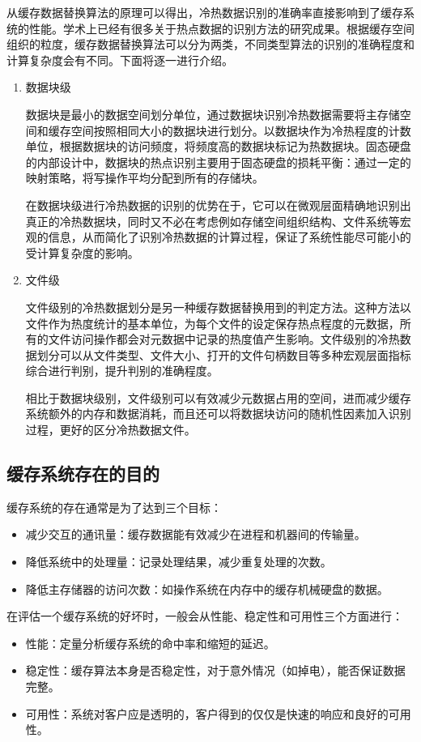 从缓存数据替换算法的原理可以得出，冷热数据识别的准确率直接影响到了缓存系统的性能。学术上已经有很多关于热点数据的识别方法的研究成果。根据缓存空间组织的粒度，缓存数据替换算法可以分为两类，不同类型算法的识别的准确程度和计算复杂度会有不同。下面将逐一进行介绍。

\begin{enumerate}
\item 数据块级

数据块是最小的数据空间划分单位，通过数据块识别冷热数据需要将主存储空间和缓存空间按照相同大小的数据块进行划分。以数据块作为冷热程度的计数单位，根据数据块的访问频度，将频度高的数据块标记为热数据块。固态硬盘的内部设计中，数据块的热点识别主要用于固态硬盘的损耗平衡：通过一定的映射策略，将写操作平均分配到所有的存储块。

在数据块级进行冷热数据的识别的优势在于，它可以在微观层面精确地识别出真正的冷热数据块，同时又不必在考虑例如存储空间组织结构、文件系统等宏观的信息，从而简化了识别冷热数据的计算过程，保证了系统性能尽可能小的受计算复杂度的影响。

\item 文件级

文件级别的冷热数据划分是另一种缓存数据替换用到的判定方法。这种方法以文件作为热度统计的基本单位，为每个文件的设定保存热点程度的元数据，所有的文件访问操作都会对元数据中记录的热度值产生影响。文件级别的冷热数据划分可以从文件类型、文件大小、打开的文件句柄数目等多种宏观层面指标综合进行判别，提升判别的准确程度。

相比于数据块级别，文件级别可以有效减少元数据占用的空间，进而减少缓存系统额外的内存和数据消耗，而且还可以将数据块访问的随机性因素加入识别过程，更好的区分冷热数据文件。
\end{enumerate}


\subsection{缓存系统存在的目的}
缓存系统的存在通常是为了达到三个目标：
\begin{itemize}
\item 减少交互的通讯量：缓存数据能有效减少在进程和机器间的传输量。
\item 降低系统中的处理量：记录处理结果，减少重复处理的次数。
\item 降低主存储器的访问次数：如操作系统在内存中的缓存机械硬盘的数据。
\end{itemize}

在评估一个缓存系统的好坏时，一般会从性能、稳定性和可用性三个方面进行：
\begin{itemize}
\item 性能：定量分析缓存系统的命中率和缩短的延迟。
\item 稳定性：缓存算法本身是否稳定性，对于意外情况（如掉电），能否保证数据完整。
\item 可用性：系统对客户应是透明的，客户得到的仅仅是快速的响应和良好的可用性。
\end{itemize}

